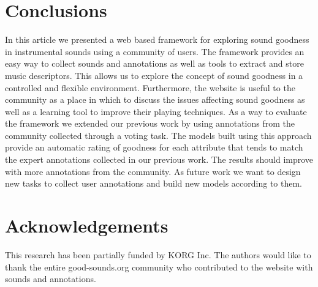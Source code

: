 \documentclass{article}
\begin{document}
\section{Conclusions}
In this article we presented a web based framework for exploring sound goodness in instrumental sounds using a community of users. The framework provides an easy way to collect sounds and annotations as well as tools to extract and store music descriptors. This allows us to explore the concept of sound goodness in a controlled and flexible environment. Furthermore, the website is useful to the community as a place in which to discuss the issues affecting sound goodness as well as a learning tool to improve their playing techniques. 
As a way to evaluate the framework we extended our previous work by using annotations from the community collected through a voting task. The models built using this approach provide an automatic rating of goodness for each attribute that tends to match the expert annotations collected in our previous work. The results should improve with more annotations from the community.
As future work we want to design new tasks to collect user annotations and build new models according to them. 

\section{Acknowledgements}
This research has been partially funded by KORG Inc. The authors would like to thank the entire good-sounds.org community who contributed to the website with sounds and annotations.

%
\end{document}
